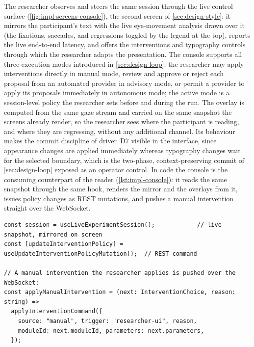 The researcher observes and steers the same session through the live control surface (\cref{fig:impl-screens-console}), the second screen of \cref{sec:design-style}: it mirrors the participant's text with the live eye-movement analysis drawn over it (the fixations, saccades, and regressions toggled by the legend at the top), reports the live end-to-end latency, and offers the interventions and typography controls through which the researcher adapts the presentation.
The console supports all three execution modes introduced in \cref{sec:design-loop}: the researcher may apply interventions directly in manual mode, review and approve or reject each proposal from an automated provider in advisory mode, or permit a provider to apply its proposals immediately in autonomous mode; the active mode is a session-level policy the researcher sets before and during the run.
The overlay is computed from the same gaze stream and carried on the same snapshot the screens already render, so the researcher sees where the participant is reading, and where they are regressing, without any additional channel.
Its behaviour makes the commit discipline of driver~D7 visible in the interface, since appearance changes are applied immediately whereas typography changes wait for the selected boundary, which is the two-phase, context-preserving commit of \cref{sec:design-loop} exposed as an operator control.
In code the console is the consuming counterpart of the reader (\cref{lst:impl-console}): it reads the same snapshot through the same hook, renders the mirror and the overlays from it, issues policy changes as REST mutations, and pushes a manual intervention straight over the WebSocket.

\begin{listing}[htbp]
\begin{verbatim}
const session = useLiveExperimentSession();            // live snapshot, mirrored on screen
const [updateInterventionPolicy] = useUpdateInterventionPolicyMutation();  // REST command

// A manual intervention the researcher applies is pushed over the WebSocket:
const applyManualIntervention = (next: InterventionChoice, reason: string) =>
  applyInterventionCommand({
    source: "manual", trigger: "researcher-ui", reason,
    moduleId: next.moduleId, parameters: next.parameters,
  });
\end{verbatim}
\caption{Researcher console (abbreviated from \texttt{researcher/current-live/index.tsx}): drives the gaze mirror and overlays from the live snapshot, issues policy changes as REST mutations, and pushes manual interventions over the WebSocket.}
\label{lst:impl-console}
\end{listing}

